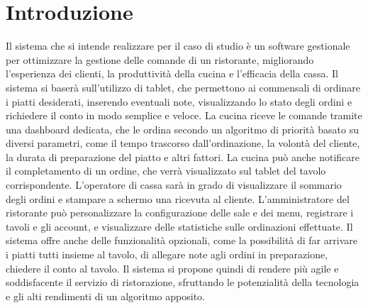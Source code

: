 \section{Introduzione}
Il sistema che si intende realizzare per il caso di studio è un software gestionale per ottimizzare la gestione delle comande di un ristorante, migliorando l’esperienza dei clienti, la produttività della cucina e l’efficacia della cassa.
Il sistema si baserà sull’utilizzo di tablet, che permettono ai commensali di ordinare i piatti desiderati, inserendo eventuali note, visualizzando lo stato degli ordini e richiedere il conto in modo semplice e veloce.
La cucina riceve le comande tramite una dashboard dedicata, che le ordina secondo un algoritmo di priorità basato su diversi parametri, come il tempo trascorso dall'ordinazione, la volontà del cliente, la durata di preparazione del piatto e altri fattori. La cucina può anche notificare il completamento di un ordine, che verrà visualizzato sul tablet del tavolo corrispondente. 
L’operatore di cassa sarà in grado di visualizzare il sommario degli ordini e stampare a schermo una ricevuta al cliente.
L'amministratore del ristorante può personalizzare la configurazione delle sale e dei menu, registrare i tavoli e gli account, e visualizzare delle statistiche sulle ordinazioni effettuate. Il sistema offre anche delle funzionalità opzionali, come la possibilità di far arrivare i piatti tutti insieme al tavolo, di allegare note agli ordini in preparazione, chiedere il conto al tavolo.
Il sistema si propone quindi di rendere più agile e soddisfacente il servizio di ristorazione, sfruttando le potenzialità della tecnologia e gli alti rendimenti di un algoritmo apposito.
\clearpage